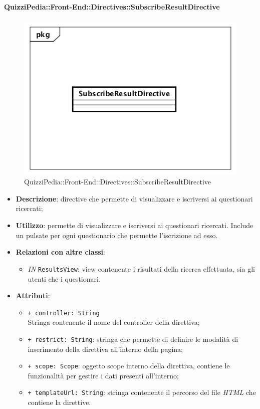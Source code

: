 \paragraph{QuizziPedia::Front-End::Directives::SubscribeResultDirective }

\label{QuizziPedia::Front-End::Directives::SubscribeResultDirective}

\begin{figure}[h]
	\centering
	\includegraphics[scale=0.5,keepaspectratio]{UML/Classi/Front-End/QuizziPedia_Front-end_Directives_SubscribeResultDirective.png}
	\caption{QuizziPedia::Front-End::Directives::SubscribeResultDirective}
\end{figure}

\begin{itemize}
	\item \textbf{Descrizione}: directive che permette di visualizzare e iscriversi ai questionari ricercati;
	\item \textbf{Utilizzo}: permette di visualizzare e iscriversi ai questionari ricercati. Include un pulsate per ogni questionario che permette l'iscrizione ad esso.
	\item \textbf{Relazioni con altre classi}:
	\begin{itemize}
		\item \textit{IN} \texttt{ResultsView}: view contenente i risultati della ricerca effettuata, sia gli utenti che i questionari.
	\end{itemize}
	\item \textbf{Attributi}:
	\begin{itemize}
		\item \texttt{+ controller: String} \\ Stringa contenente il nome del controller della direttiva;
		\item \texttt{+ restrict: String}: stringa che permette di definire le modalità di inserimento della direttiva all'interno della pagina;
		\item \texttt{+ scope: Scope}: oggetto scope interno della direttiva, contiene le funzionalità per gestire i dati presenti all'interno;
		\item \texttt{+ templateUrl: String}: stringa contenente il percorso del file \textit{HTML} che contiene la direttive.
	\end{itemize}
\end{itemize}

